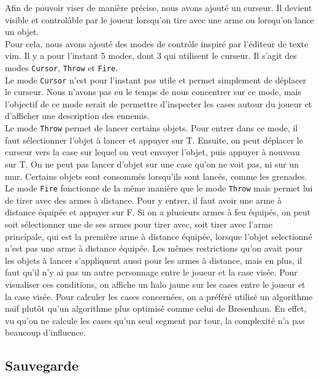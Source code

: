 \documentclass[10pt,a4paper]{article}
\begin{document}
Afin de pouvoir viser de manière précise, nous avons ajouté un curseur. Il devient visible et control\^able par le joueur lorsqu'on tire avec une arme ou lorsqu'on lance un objet.\\
Pour cela, nous avons ajouté des modes de contr\^ole inspiré par l'éditeur de texte vim. Il y a pour l'instant 5 modes, dont 3 qui utilisent le curseur. Il s'agit des modes \texttt{Cursor}, \texttt{Throw} et \texttt{Fire}.\\
Le mode \texttt{Cursor} n'est pour l'instant pas utile et permet simplement de déplacer le curseur. Nous n'avons pas eu le temps de nous concentrer sur ce mode, mais l'objectif de ce mode serait de permettre d'inspecter les cases autour du joueur et d'afficher une description des ennemis.\\
Le mode \texttt{Throw} permet de lancer certains objets. Pour entrer dans ce mode, il faut sélectionner l'objet à lancer et appuyer sur T. Ensuite, on peut déplacer le curseur vers la case sur lequel on veut envoyer l'objet, puis appuyer à nouveau sur T. On ne peut pas lancer d'objet sur une case qu'on ne voit pas, ni sur un mur. Certains objets sont consommés lorsqu'ils sont lancés, comme les grenades.\\
Le mode \texttt{Fire} fonctionne de la même manière que le mode \texttt{Throw} mais permet lui de tirer avec des armes à distance. Pour y entrer, il faut avoir une arme à distance équipée et appuyer sur F. Si on a plusieurs armes à feu équipés, on peut soit sélectionner une de ses armes pour tirer avec, soit tirer avec l'arme principale, qui est la première arme à distance équipée, lorsque l'objet selectionné n'est pas une arme à distance équipée. Les mêmes restrictions qu'on avait pour les objets à lancer s'appliquent aussi pour les armes à distance, mais en plus, il faut qu'il n'y ai pas un autre personnage entre le joueur et la case visée. Pour visualiser ces conditions, on affiche un halo jaune sur les cases entre le joueur et la case visée. Pour calculer les cases concernées, on a préféré utilisé un algorithme naïf plut\^ot qu'un algorithme plus optimisé comme celui de Bresenham. En effet, vu qu'on ne calcule les cases qu'un seul segment par tour, la complexité n'a pas beaucoup d'influence.\\

\subsection{Sauvegarde}
\end{document}
